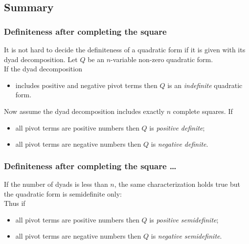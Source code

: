 \documentclass[aspectratio=169,notheorems]{corvinusmetropolis}
\theoremstyle{definition}
\begin{document}
\subsection{Summary}
\begin{frame}
    \frametitle{Definiteness after completing the square}
    It is not hard to decide the definiteness of a quadratic form if it is given with its dyad decomposition.
    Let $Q$ be an $n$-variable non-zero quadratic form.\\
    If the dyad decomposition 
    \begin{itemize}
        \item includes positive and negative pivot terms then $Q$ is an \alert{\emph{indefinite}} quadratic form.
    \end{itemize}
    Now assume the dyad decomposition includes exactly $n$ complete squares.
    If
    \begin{itemize}
        \item all pivot terms are positive numbers then $Q$ is \alert{\emph{positive definite}};
        \item all pivot terms are negative numbers then $Q$ is \alert{\emph{negative definite}}.
    \end{itemize}
\end{frame}
\begin{frame}
    \frametitle{Definiteness after completing the square \ldots}
    If the number of dyads is less than $n$, 
    the same characterization holds true but the quadratic form is semidefinite only:\\
    Thus if
    \begin{itemize}
        \item all pivot terms are positive numbers then $Q$ is \alert{\emph{positive semidefinite}};
        \item all pivot terms are negative numbers then $Q$ is \alert{\emph{negative semidefinite}}.
    \end{itemize}
\end{frame}
\end{document}
